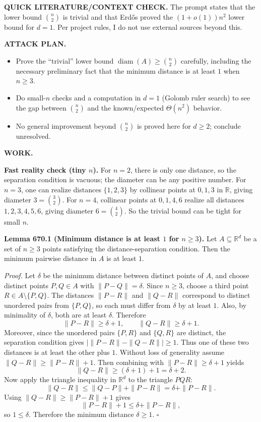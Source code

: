 \bigskip
\noindent\textbf{QUICK LITERATURE/CONTEXT CHECK.}
The prompt states that the lower bound $\binom n2$ is trivial and that Erd\H{o}s proved the $(1+o(1))n^2$ lower bound for $d=1$.
Per project rules, I do not use external sources beyond this.

\bigskip
\noindent\textbf{ATTACK PLAN.}
\begin{itemize}
\item Prove the ``trivial'' lower bound $\operatorname{diam}(A)\ge \binom n2$ carefully, including the necessary preliminary fact that the minimum distance is at least $1$ when $n\ge 3$.
\item Do small-$n$ checks and a computation in $d=1$ (Golomb ruler search) to see the gap between $\binom n2$ and the known/expected $\Theta(n^2)$ behavior.
\item No general improvement beyond $\binom n2$ is proved here for $d\ge 2$; conclude unresolved.
\end{itemize}

\bigskip
\noindent\textbf{WORK.}

\medskip
\noindent\textbf{Fast reality check (tiny $n$).}
For $n=2$, there is only one distance, so the separation condition is vacuous; the diameter can be any positive number.
For $n=3$, one can realize distances $\{1,2,3\}$ by collinear points at $0,1,3$ in $\mathbb{R}$, giving diameter $3=\binom 32$.
For $n=4$, collinear points at $0,1,4,6$ realize all distances $1,2,3,4,5,6$, giving diameter $6=\binom 42$.
So the trivial bound can be tight for small $n$.

\medskip
\noindent\textbf{Lemma 670.1 (Minimum distance is at least $1$ for $n\ge 3$).}
Let $A\subseteq\mathbb{R}^d$ be a set of $n\ge 3$ points satisfying the distance-separation condition.
Then the minimum pairwise distance in $A$ is at least $1$.

\noindent\emph{Proof.}
Let $\delta$ be the minimum distance between distinct points of $A$, and choose distinct points $P,Q\in A$ with $\|P-Q\|=\delta$.
Since $n\ge 3$, choose a third point $R\in A\setminus\{P,Q\}$.
The distances $\|P-R\|$ and $\|Q-R\|$ correspond to distinct unordered pairs from $\{P,Q\}$, so each must differ from $\delta$ by at least $1$.
Also, by minimality of $\delta$, both are at least $\delta$.
Therefore
\[
\|P-R\|\ge \delta+1,\qquad \|Q-R\|\ge \delta+1.
\]
Moreover, since the unordered pairs $\{P,R\}$ and $\{Q,R\}$ are distinct, the separation condition gives
\(|\|P-R\|-\|Q-R\||\ge 1\).
Thus one of these two distances is at least the other plus $1$.
Without loss of generality assume $\|Q-R\|\ge \|P-R\|+1$.
Then combining with $\|P-R\|\ge \delta+1$ yields
\[\|Q-R\|\ge (\delta+1)+1 = \delta+2.
\]
Now apply the triangle inequality in $\mathbb{R}^d$ to the triangle $PQR$:
\[
\|Q-R\| \le \|Q-P\| + \|P-R\| = \delta + \|P-R\|.
\]
Using $\|Q-R\|\ge \|P-R\|+1$ gives
\[
\|P-R\|+1 \le \delta + \|P-R\|,
\]
so $1\le \delta$.
Therefore the minimum distance $\delta\ge 1$.
\hfill$\square$

